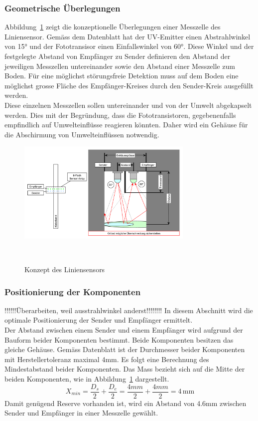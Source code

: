 \documentclass[main.tex]{subfiles} %
\begin{document}
\subsubsection{Geometrische Überlegungen}
Abbildung~\ref{fig:Konzept_graphml} zeigt die konzeptionelle Überlegungen einer Messzelle des
Liniensensor. Gemäss dem Datenblatt hat der UV-Emitter einen Abstrahlwinkel von 15° und der
Fototransisor einen Einfallswinkel von 60°. Diese Winkel und der festgelegte Abstand von 
Empfänger zu Sender definieren den Abstand der jeweiligen Messzellen untereinander sowie den
Abstand einer Messzelle zum Boden. Für eine möglichst störungsfreie Detektion muss auf dem Boden 
eine möglichst grosse Fläche des Empfänger-Kreises durch den Sender-Kreis ausgefüllt werden.\\
Diese einzelnen Messzellen sollen untereinander und von der Umwelt abgekapselt werden. Dies
mit der Begründung, dass die Fototransistoren, gegebenenfalls empfindlich auf
Umwelteinflüsse reagieren könnten. Daher wird ein Gehäuse für die Abschirmung von Umwelteinflüssen
notwendig.

\begin{figure}[H]
    \centering
    \includegraphics[width=0.75\textwidth]{fig_Strecke_Tracken/Konzept.pdf}
    \caption{Konzept des Liniensensors}~\label{fig:Konzept_graphml}
\end{figure}
\subsubsection{Positionierung der Komponenten}
!!!!!!Überarbeiten, weil ausstrahlwinkel anderst!!!!!!!!
In diesem Abschnitt wird die optimale Positionierung der Sender und Empfänger ermittelt.\\ 
Der Abstand zwischen einem Sender und einem Empfänger wird aufgrund der Bauform beider 
Komponenten bestimmt.
Beide Komponenten besitzen das gleiche Gehäuse. Gemäss Datenblatt ist der Durchmesser
beider Komponenten mit Herstellertoleranz maximal 4mm. Es folgt eine Berechnung des 
Mindestabstand beider Komponenten. Das Mass bezieht sich auf die Mitte der beiden 
Komponenten, wie in Abbildung~\ref{fig:Konzept_graphml} dargestellt.
\[ X_{min} = \frac{D_s}{2} + \frac{D_e}{2} = \frac{4mm}{2} + \frac{4mm}{2} = 4\,\text{mm} \]
Damit genügend Reserve vorhanden ist, wird ein Abstand von 4.6mm zwischen Sender und
Empfänger in einer Messzelle gewählt.\\
\end{document}
